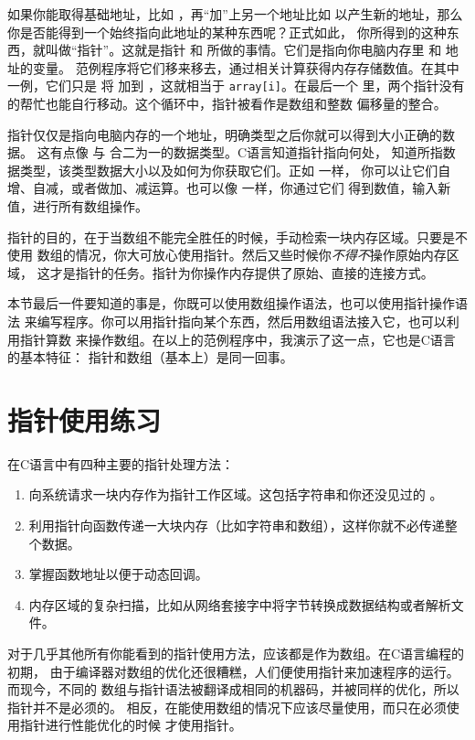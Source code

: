 如果你能取得基础地址，比如 ，再“加”上另一个地址比如 
以产生新的地址，那么你是否能得到一个始终指向此地址的某种东西呢？正式如此，
你所得到的这种东西，就叫做“指针”。这就是指针  和 
所做的事情。它们是指向你电脑内存里  和  地址的变量。
范例程序将它们移来移去，通过相关计算获得内存存储数值。在其中一例，它们只是
将  加到 ，这就相当于 \verb|array[i]|。在最后一个 
里，两个指针没有  的帮忙也能自行移动。这个循环中，指针被看作是数组和整数
偏移量的整合。

指针仅仅是指向电脑内存的一个地址，明确类型之后你就可以得到大小正确的数据。
这有点像  与  合二为一的数据类型。C语言知道指针指向何处，
知道所指数据类型，该类型数据大小以及如何为你获取它们。正如  一样，
你可以让它们自增、自减，或者做加、减运算。也可以像  一样，你通过它们
得到数值，输入新值，进行所有数组操作。

指针的目的，在于当数组不能完全胜任的时候，手动检索一块内存区域。只要是不使用
数组的情况，你大可放心使用指针。然后又些时候你\emph{不得不}操作原始内存区域，
这才是指针的任务。指针为你操作内存提供了原始、直接的连接方式。

本节最后一件要知道的事是，你既可以使用数组操作语法，也可以使用指针操作语法
来编写程序。你可以用指针指向某个东西，然后用数组语法接入它，也可以利用指针算数
来操作数组。在以上的范例程序中，我演示了这一点，它也是C语言的基本特征：
指针和数组（基本上）是同一回事。

\section{指针使用练习}

在C语言中有四种主要的指针处理方法：

\begin{enumerate}
\item 向系统请求一块内存作为指针工作区域。这包括字符串和你还没见过的 。 
\item 利用指针向函数传递一大块内存（比如字符串和数组），这样你就不必传递整个数据。
\item 掌握函数地址以便于动态回调。
\item 内存区域的复杂扫描，比如从网络套接字中将字节转换成数据结构或者解析文件。
\end{enumerate}

对于几乎其他所有你能看到的指针使用方法，应该都是作为数组。在C语言编程的初期，
由于编译器对数组的优化还很糟糕，人们便使用指针来加速程序的运行。而现今，不同的
数组与指针语法被翻译成相同的机器码，并被同样的优化，所以指针并不是必须的。
相反，在能使用数组的情况下应该尽量使用，而只在必须使用指针进行性能优化的时候
才使用指针。

